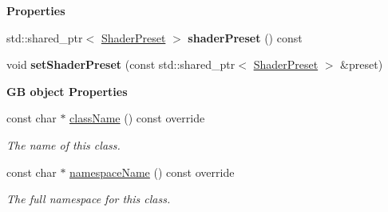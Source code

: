 \begin{Indent}\textbf{ Properties}\par
\begin{DoxyCompactItemize}
\item 
\mbox{\label{classrev_1_1_shader_component_af06b250469d6d0c3f484754987b258c3}} 
std\+::shared\+\_\+ptr$<$ \mbox{\hyperlink{classrev_1_1_shader_preset}{Shader\+Preset}} $>$ {\bfseries shader\+Preset} () const
\item 
\mbox{\label{classrev_1_1_shader_component_aa20fb1e4d58cdaba3d739079332b3a01}} 
void {\bfseries set\+Shader\+Preset} (const std\+::shared\+\_\+ptr$<$ \mbox{\hyperlink{classrev_1_1_shader_preset}{Shader\+Preset}} $>$ \&preset)
\end{DoxyCompactItemize}
\end{Indent}
\begin{Indent}\textbf{ GB object Properties}\par
\begin{DoxyCompactItemize}
\item 
const char $\ast$ \mbox{\hyperlink{classrev_1_1_shader_component_a62ddc1d5981e4952890a628ca5b6d12a}{class\+Name}} () const override
\begin{DoxyCompactList}\small\item\em The name of this class. \end{DoxyCompactList}\item 
const char $\ast$ \mbox{\hyperlink{classrev_1_1_shader_component_ac052c16eed35e22f62df1d06cf346d55}{namespace\+Name}} () const override
\begin{DoxyCompactList}\small\item\em The full namespace for this class. \end{DoxyCompactList}\end{DoxyCompactItemize}
\end{Indent}
